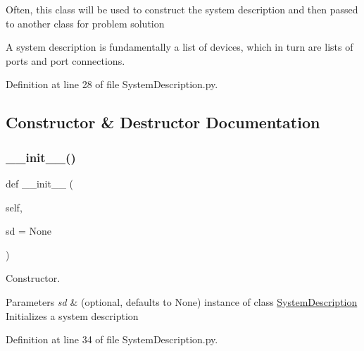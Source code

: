 Often, this class will be used to construct the system description and then passed to another class for problem solution

A system description is fundamentally a list of devices, which in turn are lists of ports and port connections. 

Definition at line 28 of file System\+Description.\+py.



\subsection{Constructor \& Destructor Documentation}
\mbox{\label{classSignalIntegrity_1_1SystemDescriptions_1_1SystemDescription_1_1SystemDescription_a2fa2ae61a4511a760e2d2047ec07eb05}} 
\subsubsection{\texorpdfstring{\+\_\+\+\_\+init\+\_\+\+\_\+()}{\_\_init\_\_()}}
{\footnotesize\ttfamily def \+\_\+\+\_\+init\+\_\+\+\_\+ (\begin{DoxyParamCaption}\item[{}]{self,  }\item[{}]{sd = {\ttfamily None} }\end{DoxyParamCaption})}



Constructor. 


\begin{DoxyParams}{Parameters}
{\em sd} & (optional, defaults to None) instance of class \hyperlink{classSignalIntegrity_1_1SystemDescriptions_1_1SystemDescription_1_1SystemDescription}{System\+Description} Initializes a system description \\
\hline
\end{DoxyParams}


Definition at line 34 of file System\+Description.\+py.



